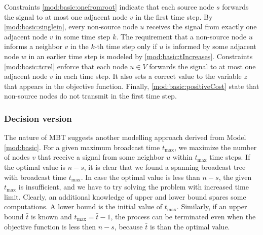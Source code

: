 Constraints \eqref{mod:basic:onefromroot} indicate that each source node $s$ forwards the signal to at most one adjacent node $v$ in the first time step. 
By \eqref{mod:basic:singlein}, every non-source node $u$ receives the signal from exactly one adjacent node $v$ in some time step $k$.
The requirement that a non-source node $u$ informs a neighbor $v$ in the $k$-th time step only if $u$ is informed by some adjacent node $w$ in an earlier time step is modeled by \eqref{mod:basic:tIncreases}. 
Constraints \eqref{mod:basic:tcrel} enforce that each node $u\in V$ forwards the signal to at most one adjacent node $v$ in each time step.
It also sets a correct value to the variable $z$ that appears in the objective function.
Finally, \eqref{mod:basic:positiveCost} state that non-source nodes do not transmit in the first time step.

\subsubsection{Decision version}
\label{sec:decbasic}
The nature of MBT suggests another modelling approach derived from Model \ref{mod:basic}. 
For a given maximum broadcast time $t_{\text{max}}$, we maximize the number of nodes $v$ that receive a signal from some neighbor $u$ within $t_{\text{max}}$ time steps.
If the optimal value is $n-s$, it is clear that we found a spanning broadcast tree with broadcast time $t_{\text{max}}$.
In case the optimal value is less than $n-s$, the given $t_{\text{max}}$ is insufficient, and we have to try solving the problem with increased time limit.
Clearly, an additional knowledge of upper and lower bound spares some computations. 
A lower bound is the initial value of $t_{\text{max}}$. 
Similarly, if an upper bound $\bar{t}$ is known and $t_{\text{max}}=\bar{t}-1$, the process can be terminated even when the objective function is less then $n-s$, because $\bar{t}$ is than the optimal value.

